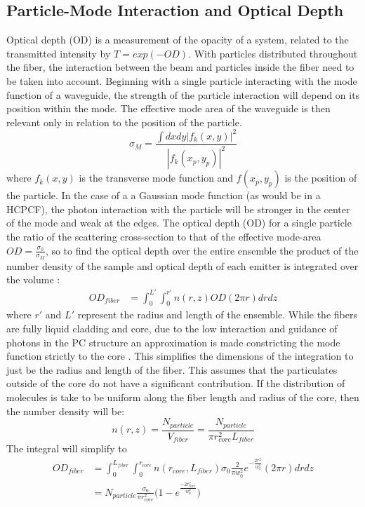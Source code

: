 \subsection{Particle-Mode Interaction and Optical Depth}
Optical depth (OD) is a measurement of the opacity of a system, related to the transmitted intensity by $T = exp(-OD)$. With particles distributed throughout the fiber, the interaction between the beam and particles inside the fiber need to be taken into account. Beginning with a single particle interacting with the mode function of a waveguide, the strength of the particle interaction will depend on its position within the mode\cite{domokos, mazoni}. The effective mode area of the waveguide is then relevant only in relation to the position of the particle. 
\begin{equation}
	\sigma_M = \frac{\int dxdy|f_k(x, y)|^2}{|f_k(x_p, y_p)|^2}
\end{equation}
where $f_k(x,y)$ is the transverse mode function and $f(x_p,y_p )$ is the position of the particle. In the case of a a Gaussian mode function (as would be in a HCPCF), the photon interaction with the particle will be stronger in the center of the mode and weak at the edges. The optical depth (OD) for a single particle the ratio of the scattering cross-section to that of the effective mode-area $OD =\frac{\sigma_0}{\sigma_M}$, so to find the optical depth over the entire ensemble the product of the number density of the sample and optical depth of each emitter is integrated over the volume :
\begin{equation}
	\begin{aligned}
		OD_{fiber} &= \int^{L'}_0 \int^{r'}_0 n(r, z)OD(2\pi r) dr dz 
	\end{aligned}
\end{equation}
where $r'$ and $L'$ represent the radius and length of the ensemble.  While the fibers are fully liquid cladding and core, due to the low interaction and guidance of photons in the PC structure an approximation is made constricting the mode function strictly to the core . This simplifies the dimensions of the integration to just be the radius and length of the fiber. This assumes that the particulates outside of the core do not have a significant contribution.  If the distribution of molecules is take to be uniform along the fiber length and radius of the core, then the number density will be: 
\begin{equation}
	n(r, z) = \frac{N_{particle}}{V_{fiber}} = \frac{N_{particle}}{\pi r_{core}^2L_{fiber}} 
\end{equation}
The integral will simplify to
\begin{equation}
	\begin{aligned}
		OD_{fiber} &= \int^{L_{fiber}}_0 \int^{r_{core}}_0  n(r_{core}, L_{fiber})\sigma_0 \frac{2}{\pi w_0^2}e^{-\frac{2r^2}{w_0^2}}(2\pi r) dr dz\\
		&= N_{particle}\frac{\sigma_0}{\pi r^2_{core}}\big(1-e^{\frac{-2r_{core}^2}{w_0^2}}\big)
	\label{OD}
	\end{aligned}
\end{equation}


